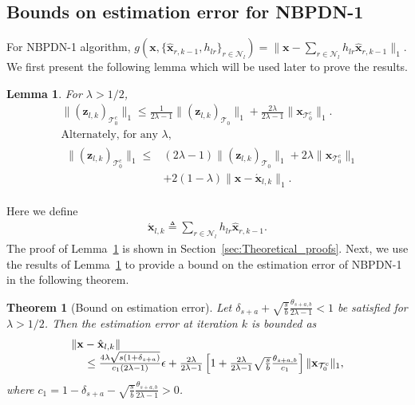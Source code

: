 \documentclass[journal]{IEEEtran}
\newcommand{\mbx}{\mathbf{x}}
\newcommand{\mbz}{\mathbf{z}}
\newcommand{\T}{\mathcal{T}}
\newtheorem{theorem}{Theorem}
\newtheorem{lemma}{Lemma}
\begin{document}
\subsection{Bounds on estimation error for NBPDN-1}
For NBPDN-1 algorithm, $g(\mbx,\{\hat{\mbx}_{r,k-1}, h_{lr}\}_{r \in \mathcal{N}_l}) = \|\mbx-\sum_{r \in \mathcal{N}_l} h_{lr} \hat{\mbx}_{r,k-1}\|_1$.
We first present the following lemma which will be used later to prove the results.
\begin{lemma}
\label{lem:inequality_lemma}
For $\lambda > 1/2$,
\begin{subequations}
    \begin{align}
& \|\left(\mbz_{l,k}\right)_{\T_0^c}\|_1 \leq \frac{1}{2 \lambda -1}\|\left(\mbz_{l,k}\right)_{\T_0}\|_1 + \frac{2\lambda}{2\lambda -1}\|\mbx_{\T_0^c}\|_1. \label{eq:lemma_algo1_1} \\
& \text{Alternately, for any } \lambda, \nonumber \\
& \begin{array}{rl}
\|\left(\mbz_{l,k}\right)_{\T_0^c}\|_1 \leq & (2 \lambda -1)\|\left(\mbz_{l,k}\right)_{\T_0}\|_1 + 2\lambda\|\mbx_{\T_0^c}\|_1  \\
& + 2(1-\lambda)\|\mbx  - \acute{\mbx}_{l,k}\|_1. \label{eq:lemma_algo1_2}
\end{array}
\end{align}
\end{subequations}
\end{lemma}
Here we define
\begin{eqnarray*}
 \acute{\mbx}_{l,k} \triangleq \sum\limits_{r \in \mathcal{N}_l} h_{lr} \hat{\mbx}_{r,k-1}.
\end{eqnarray*}
The proof of Lemma~\ref{lem:inequality_lemma} is shown in Section~\ref{sec:Theoretical_proofs}. Next, we use the results of Lemma~\ref{lem:inequality_lemma} to provide a bound on the estimation error of NBPDN-1 in the following theorem.
\begin{theorem}[Bound on estimation error]
\label{thm:l1_conv_theorem1}
Let $\delta_{s+a}+\sqrt{\frac{s}{b}}\frac{\theta_{s+a,b}}{2\lambda -1} < 1$ be satisfied for $\lambda > 1/2$. Then the estimation error at iteration $k$ is bounded as
\begin{eqnarray*}
\begin{array}{l}
\|\mbx-\hat{\mbx}_{l,k}\| \\ \hspace{5mm}\leq \frac{4 \lambda \sqrt{s(1+\delta_{s+a})}}{c_1(2\lambda -1)} \epsilon + \frac{2\lambda}{2\lambda -1}\left[1 + \frac{2\lambda}{2\lambda -1} \sqrt{\frac{s}{b}} \frac{\theta_{s+a,b}}{c_1}\right]\|\mbx_{\T_0^c}\|_1,
\end{array}
\end{eqnarray*}
where $c_1 = 1-\delta_{s+a}-\sqrt{\frac{s}{b}}\frac{\theta_{s+a,b}}{2\lambda -1} > 0$.
\end{theorem}
\end{document}

